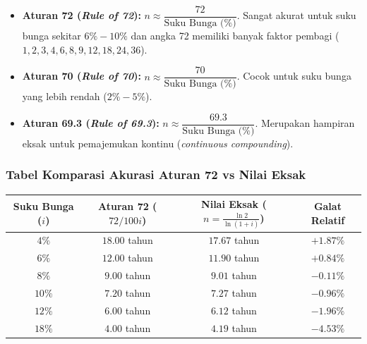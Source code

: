 \documentclass[11pt,a4paper]{article}
\begin{document}
\begin{definitionbox}
\begin{itemize}[leftmargin=1.5em]
    \item \textbf{Aturan 72 (\textit{Rule of 72}):} $n \approx \dfrac{72}{\text{Suku Bunga (\%)}}$. Sangat akurat untuk suku bunga sekitar $6\% - 10\%$ dan angka 72 memiliki banyak faktor pembagi ($1, 2, 3, 4, 6, 8, 9, 12, 18, 24, 36$).
    \item \textbf{Aturan 70 (\textit{Rule of 70}):} $n \approx \dfrac{70}{\text{Suku Bunga (\%)}}$. Cocok untuk suku bunga yang lebih rendah ($2\% - 5\%$).
    \item \textbf{Aturan 69.3 (\textit{Rule of 69.3}):} $n \approx \dfrac{69.3}{\text{Suku Bunga (\%)}}$. Merupakan hampiran eksak untuk pemajemukan kontinu (\textit{continuous compounding}).
\end{itemize}
\end{definitionbox}

\subsubsection{Tabel Komparasi Akurasi Aturan 72 vs Nilai Eksak}
\begin{center}
\renewcommand{\arraystretch}{1.3}
\begin{tabular}{cccc}
\toprule
\textbf{Suku Bunga ($i$)} & \textbf{Aturan 72 ($72 / 100i$)} & \textbf{Nilai Eksak ($n = \frac{\ln 2}{\ln(1+i)}$)} & \textbf{Galat Relatif} \\
\midrule
$4\%$ & $18.00$ tahun & $17.67$ tahun & $+1.87\%$ \\
$6\%$ & $12.00$ tahun & $11.90$ tahun & $+0.84\%$ \\
$8\%$ & $9.00$ tahun & $9.01$ tahun & $-0.11\%$ \\
$10\%$ & $7.20$ tahun & $7.27$ tahun & $-0.96\%$ \\
$12\%$ & $6.00$ tahun & $6.12$ tahun & $-1.96\%$ \\
$18\%$ & $4.00$ tahun & $4.19$ tahun & $-4.53\%$ \\
\bottomrule
\end{tabular}
\end{center}
\end{document}

